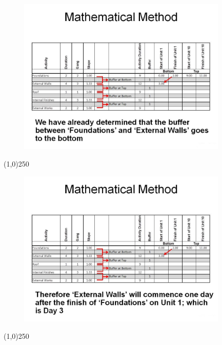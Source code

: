 \begin{frame}
\begin{figure}
	\centering
		\includegraphics[width = 10.0cm]{oldnotes/Slide285.jpg}
\end{figure}
\end{frame}
\begin{center}\line(1,0){250}\end{center}






\begin{frame}
\begin{figure}
	\centering
		\includegraphics[width = 10.0cm]{oldnotes/Slide286.jpg}
\end{figure}
\end{frame}
\begin{center}\line(1,0){250}\end{center}







